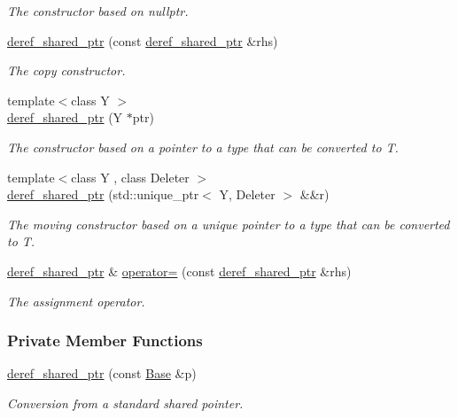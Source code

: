 \begin{DoxyCompactItemize}
\begin{DoxyCompactList}\small\item\em The constructor based on {\ttfamily nullptr}. \end{DoxyCompactList}\item 
\hyperlink{classderef__shared__ptr_a02a1bcbdbc08de499e0ca1de870fbcb6}{deref\+\_\+shared\+\_\+ptr} (const \hyperlink{classderef__shared__ptr}{deref\+\_\+shared\+\_\+ptr} \&rhs)
\begin{DoxyCompactList}\small\item\em The copy constructor. \end{DoxyCompactList}\item 
{\footnotesize template$<$class Y $>$ }\\\hyperlink{classderef__shared__ptr_adee426d872a99caee93b35f6dd524a8f}{deref\+\_\+shared\+\_\+ptr} (Y $\ast$ptr)
\begin{DoxyCompactList}\small\item\em The constructor based on a pointer to a type that can be converted to {\ttfamily T}. \end{DoxyCompactList}\item 
{\footnotesize template$<$class Y , class Deleter $>$ }\\\hyperlink{classderef__shared__ptr_aaa21d20e9c166a076568b239c4a1820e}{deref\+\_\+shared\+\_\+ptr} (std\+::unique\+\_\+ptr$<$ Y, Deleter $>$ \&\&r)
\begin{DoxyCompactList}\small\item\em The moving constructor based on a unique pointer to a type that can be converted to {\ttfamily T}. \end{DoxyCompactList}\item 
\hyperlink{classderef__shared__ptr}{deref\+\_\+shared\+\_\+ptr} \& \hyperlink{classderef__shared__ptr_a06934be61483fb8d2aa731cfa665bde6}{operator=} (const \hyperlink{classderef__shared__ptr}{deref\+\_\+shared\+\_\+ptr} \&rhs)
\begin{DoxyCompactList}\small\item\em The assignment operator. \end{DoxyCompactList}\end{DoxyCompactItemize}
\subsubsection*{Private Member Functions}
\begin{DoxyCompactItemize}
\item 
\hyperlink{classderef__shared__ptr_a3e67061c67365784b4dac43e53e8d1a4}{deref\+\_\+shared\+\_\+ptr} (const \hyperlink{classderef__shared__ptr_a805d2a5f7dc7ecab217dba0077efee8c}{Base} \&p)
\begin{DoxyCompactList}\small\item\em Conversion from a standard shared pointer. \end{DoxyCompactList}\end{DoxyCompactItemize}

